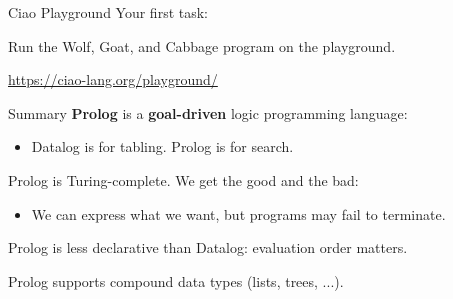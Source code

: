 \begin{frame}{Ciao Playground}
Your first task:

\Large
Run the Wolf, Goat, and Cabbage program on the playground.

\bigskip

\centering
{\Large \url{https://ciao-lang.org/playground/}}
\end{frame}

\begin{frame}{Summary}
\textbf{Prolog} is a \textbf{goal-driven} logic programming language:
%
\begin{itemize}
    \item Datalog is for tabling. Prolog is for search. 
\end{itemize}

Prolog is Turing-complete. We get the good and the bad: 
%
\begin{itemize}
    \item We can express what we want, but programs may fail to terminate.
\end{itemize}

Prolog is less declarative than Datalog: evaluation order matters.

Prolog supports compound data types (lists, trees, ...).
\end{frame}
    
    
\begin{frame}[standout]
\end{frame}


